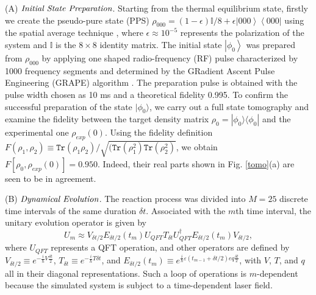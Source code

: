 \documentclass[twocolumn,showpacs,twoside,10pt,prl]{revtex4}
\begin{document}
(A) $\emph{Initial State Preparation}$. Starting from the thermal equilibrium state, firstly we create the pseudo-pure state (PPS) $\rho_{000}=(1-\epsilon)\mathbb{{I}}/8+\epsilon \left\vert 000 \right\rangle \left\langle000\right\vert$ using the spatial average technique \cite{spatial}, where $\epsilon \approx 10^{-5}$ represents the polarization of the system and ${\mathbb{{I}}}$ is the $8\times 8$ identity matrix.
The initial state $\left\vert \phi_{0} \right\rangle$ was prepared from $\rho_{000}$ by applying one shaped radio-frequency
(RF) pulse characterized by 1000 frequency
segments and determined by the GRadient Ascent Pulse Engineering (GRAPE) algorithm \cite{grape1,grape2,grape3}. The preparation pulse is obtained with the pulse width chosen as 10 ms and a theoretical fidelity 0.995.
To confirm the successful preparation of the state $\vert\phi_0\rangle$,   we carry out
 a full state tomography and examine the fidelity between the target density matrix $\rho_0=|\phi_0\rangle\langle\phi_0|$ and the experimental one $\rho_{exp}(0)$.  Using the
 fidelity definition $F(\rho_{1}, \rho_{2})\equiv \texttt{Tr}(\rho_1{\rho_2})/\sqrt{(\texttt{Tr}(\rho_1^2)\texttt{Tr}(\rho_2^2)}$,
 we obtain $F[\rho_0, \rho_{exp}(0)]=0.950$. Indeed, their real parts shown in Fig. \ref{tomo}(a) are seen to be in agreement.

(B) $\emph{Dynamical Evolution}$. The reaction process was divided into $M=25$ discrete time intervals of the same duration $\delta t$.
Associated with the $m$th time interval, the unitary evolution operator is given by
\begin{equation}
U_m\approx V_{\delta t/2}{E}_{\delta t/2}(t_m)U_{QFT}T_{\delta t}U_{QFT}^{\dagger}{E}_{\delta t/2}(t_{m}){V}_{\delta t/2},
\end{equation}
where $U_{QFT}$ represents a QFT operation, and other operators are defined by ${V}_{\delta t/2}\equiv e^{-\frac{i}{\hbar}{V}\frac{\delta t}{2}}$, ${T}_{\delta t} \equiv e^{-\frac{i}{\hbar}{T}\delta t}$, and ${E}_{\delta t/2}(t_m)\equiv e^{\frac{i}{\hbar}\varepsilon(t_{m-1}+\delta t/2) e q\frac{\delta t}{2}}$, with $V$, $T$, and $q$ all in their diagonal representations.  Such a loop of operations is $m$-dependent because the simulated system is subject to a time-dependent laser field.
\end{document}

